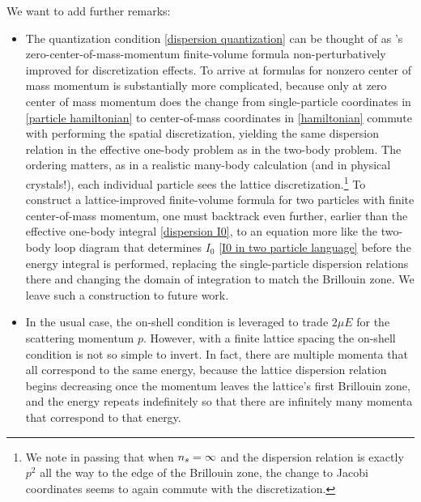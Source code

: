 We want to add further remarks:
\begin{itemize}
\item The quantization condition \eqref{dispersion quantization} can be thought of as \Luscher's zero-center-of-mass-momentum finite-volume formula non-perturbatively improved for discretization effects.
To arrive at formulas for nonzero center of mass momentum is substantially more complicated, because only at zero center of mass momentum does the change from single-particle coordinates in \eqref{particle hamiltonian} to center-of-mass coordinates in \eqref{hamiltonian} commute with performing the spatial discretization, yielding the same dispersion relation in the effective one-body problem as in the two-body problem.
The ordering matters, as in a realistic many-body calculation (and in physical crystals!), each individual particle sees the lattice discretization.\footnote{
We note in passing that when ${n_s}=\infty$ and the dispersion relation is exactly $p^2$ all the way to the edge of the Brillouin zone, the change to Jacobi coordinates seems to again commute with the discretization.}
To construct a lattice-improved finite-volume formula for two particles with finite center-of-mass momentum, one must backtrack even further, earlier than the effective one-body integral \eqref{dispersion I0}, to an equation more like the two-body loop diagram that determines $I_0$ \eqref{I0 in two particle language} before the energy integral is performed, replacing the single-particle dispersion relations there and changing the domain of integration to match the Brillouin zone.
We leave such a construction to future work.

\item In the usual case, the on-shell condition is leveraged to trade $2\mu E$ for the scattering momentum $p$.
However, with a finite lattice spacing the on-shell condition is not so simple to invert.
In fact, there are multiple momenta that all correspond to the same energy, because the lattice dispersion relation begins decreasing once the momentum leaves the lattice's first Brillouin zone, and the energy repeats indefinitely so that there are infinitely many momenta that correspond to that energy.


\end{itemize}
